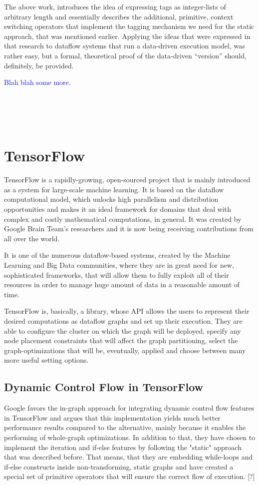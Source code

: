 \documentclass[ack,preface]{dithesis}
\begin{document}
The above work, introduces the idea of expressing tags as integer-lists of arbitrary length and essentially describes the additional, primitive, context switching operators that implement the tagging mechanism we need for the static approach, that was mentioned earlier. Applying the ideas that were expressed in that research to dataflow systems that run a data-driven execution model, was rather easy, but a formal, theoretical proof of the data-driven “version” should, definitely, be provided.

 \textcolor{blue}{Blah blah some more.} \\\\\\\\\

    \section{TensorFlow}

TensorFlow is a rapidly-growing, open-sourced project that is mainly introduced as a system for large-scale machine learning. It is based on the dataflow computational model, which unlocks high parallelism and distribution opportunities and makes it an ideal framework for domains that deal with complex and costly mathematical computations, in general. It was created by Google Brain Team’s researchers and it is now being receiving contributions from all over the world. 

It is one of the numerous dataflow-based systems, created by the Machine Learning and Big Data communities, where they are in great need for new, sophisticated frameworks, that will allow them to fully exploit all of their resources in order to manage huge amount of data in a reasonable amount of time.

TensorFlow is, basically, a library, whose API allows the users to represent their desired computations as dataflow graphs and set up their execution. 
They are able to configure the cluster on which the graph will be deployed, specify any node placement constraints that will affect the graph partitioning, select the graph-optimizations that will be, eventually, applied and choose between many more useful setting options.
    \subsection{Dynamic Control Flow in TensorFlow}
Google favors the in-graph approach for integrating dynamic control flow features in TensorFlow and argues that this implementation yields much better performance results compared to the alternative, mainly because it enables the performing of whole-graph optimizations. In addition to that, they have chosen to implement the iteration and if-else features by following the "static" approach that was described before. That means, that they are embedding while-loops and if-else constructs inside non-transforming, static graphs and have created a special set of primitive operators that will ensure the correct flow of execution. [?]
\end{document}
